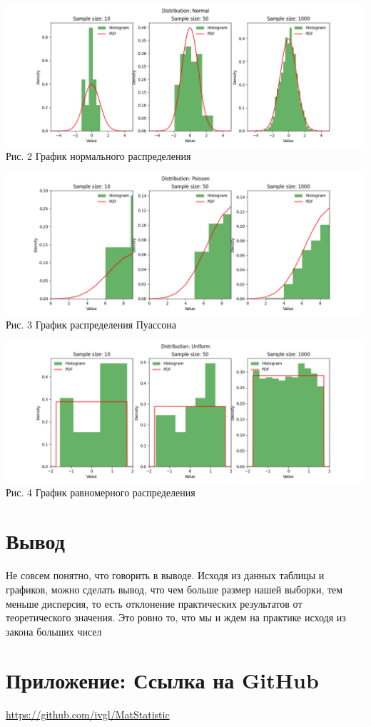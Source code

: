 \documentclass[12pt]{article}
\begin{document}
\begin{center}
    \includegraphics[scale=0.65]{lab_1_Normal.png} \\
    Рис. 2 График нормального распределения
\end{center}

\begin{center}
    \includegraphics[scale=0.65]{lab_1_Poisson.png} \\
    Рис. 3 График распределения Пуассона
\end{center}

\begin{center}
    \includegraphics[scale=0.65]{lab_1_Uniform.png} \\
    Рис. 4 График равномерного распределения
\end{center}

\section{Вывод}
Не совсем понятно, что говорить в выводе. Исходя из данных таблицы и графиков, можно сделать вывод, что чем больше размер нашей выборки, тем меньше дисперсия, то есть отклонение практических результатов от теоретического значения. Это ровно то, что мы и ждем на практике исходя из закона больших чисел


\section*{Приложение: Ссылка на GitHub}


\url{https://github.com/ivgl/MatStatistic}
\end{document}
